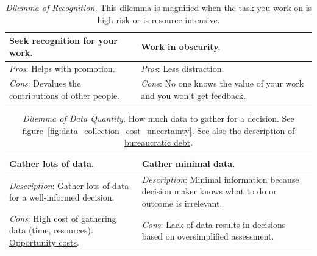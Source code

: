 \begin{center}
\begin{table}[H] %
\begin{tabular}{ | m{\dilemmatablewidth}| m{\dilemmatablewidth} | } 
  \hline
  \textbf{Seek recognition for your work.} &
  \textbf{Work in obscurity.} \\
  \hline
  \textit{Pros}: Helps with promotion. & 
  \textit{Pros}: Less distraction. \\
  \hline
  \textit{Cons}: Devalues the contributions of other people. & 
  \textit{Cons}: No one knows the value of your work and you won't get feedback. \\
  \hline
\end{tabular}
\caption{
\textit{Dilemma of Recognition.}
This dilemma is magnified when the task you work on is high risk or is resource intensive. 
}
\label{table:recognition-obscurity}
\end{table}
\end{center}



\begin{center}
\begin{table}[H] %
\begin{tabular}{ | m{\dilemmatablewidth}| m{\dilemmatablewidth} | } 
  \hline
  \textbf{Gather lots of data.} &
  \textbf{Gather minimal data.} \\
  \hline
  \textit{Description}: Gather lots of data for a well-informed decision. &
  \textit{Description}: Minimal information because decision maker knows what to do or outcome is irrelevant.  \\  
  \hline
  \textit{Cons}: High cost of gathering data (time, resources). \href{https://en.wikipedia.org/wiki/Opportunity_cost}{Opportunity costs}.
  \index{Wikipedia!\href{https://en.wikipedia.org/wiki/Opportunity_cost}{Opportunity cost}}
  & 
  \textit{Cons}: Lack of data results in decisions based on oversimplified assessment. \\
  \hline
\end{tabular}
\caption{
\textit{Dilemma of Data Quantity.}
How much data to gather for a decision. See figure~\ref{fig:data_collection_cost_uncertainty}. See also the description of 
 \hyperref[sec:bureaucratic-debt]{bureaucratic debt}.
}
\label{table:gather-data-lots-vs-little}
\end{table}
\end{center}

